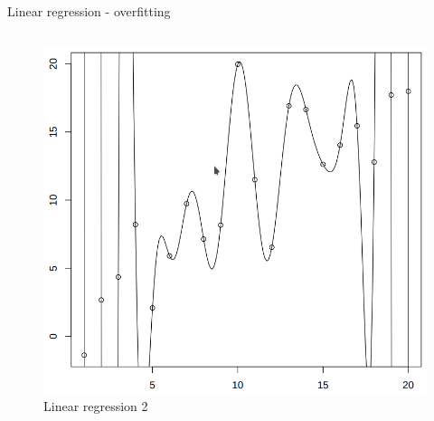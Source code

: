 \documentclass[aspectratio=169]{beamer}
\begin{document}
\begin{frame}{Linear regression - overfitting}
\begin{columns}
\begin{column}{0.5\textwidth}
\begin{center}
\begin{figure}
                \includegraphics[scale=0.281]{./images/polyreg.png}
                \caption{Linear regression 2}
            \end{figure}
        \end{center}
    \end{column}
    \end{columns}
\end{frame}
\end{document}
